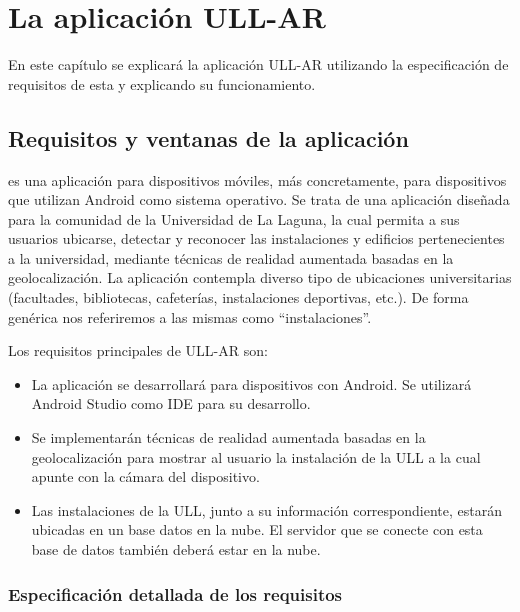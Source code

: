 
%
%
%

\chapter{La aplicación ULL-AR} \label{chap:LaAplicacion} 

En este capítulo se explicará la aplicación ULL-AR utilizando la especificación de requisitos de esta y explicando su funcionamiento.

\section{Requisitos y ventanas de la aplicación} %

\ULLAR{} es una aplicación para dispositivos móviles, más concretamente, para dispositivos que utilizan Android como sistema operativo. 
Se trata de una aplicación diseñada para la comunidad de la Universidad de La Laguna, la cual permita a sus usuarios ubicarse, detectar y reconocer las instalaciones y edificios pertenecientes a la universidad, mediante técnicas de realidad aumentada basadas en la geolocalización.
La aplicación contempla diverso tipo de ubicaciones universitarias (facultades, bibliotecas, cafeterías,
instalaciones deportivas, etc.). De forma genérica nos referiremos a las mismas como ``instalaciones''.

Los requisitos principales de ULL-AR son:
\begin{itemize}
    \item La aplicación se desarrollará para dispositivos con Android. Se utilizará Android Studio como IDE para su desarrollo.
    \item Se implementarán técnicas de realidad aumentada basadas en la geolocalización para mostrar al usuario la instalación de la ULL a la cual apunte con la cámara del dispositivo.
    \item Las instalaciones de la ULL, junto a su información correspondiente, estarán ubicadas en un base datos en la nube. El servidor que se conecte con esta base de datos también deberá estar en la nube.
\end{itemize}

\subsection{Especificación detallada de los requisitos} 

